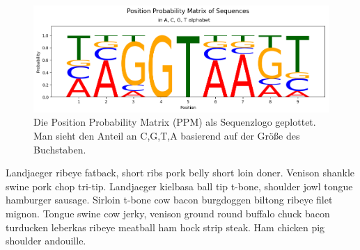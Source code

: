 \begin{figure}[h]
	\begin{center}
		\includegraphics[scale=0.5]{../pss/pss_ppm.png}	
	\end{center}
	\caption{Die Position Probability Matrix (PPM) als Sequenzlogo geplottet. Man sieht den Anteil an C,G,T,A basierend auf der
	Größe des Buchstaben.}
\end{figure}

\bigskip\noindent
Landjaeger ribeye fatback, short ribs pork belly short loin doner. Venison shankle swine pork chop tri-tip. Landjaeger kielbasa ball tip t-bone, shoulder jowl tongue hamburger sausage. Sirloin t-bone cow bacon burgdoggen biltong ribeye filet mignon. Tongue swine cow jerky, venison ground round buffalo chuck bacon turducken leberkas ribeye meatball ham hock strip steak. Ham chicken pig shoulder andouille.

